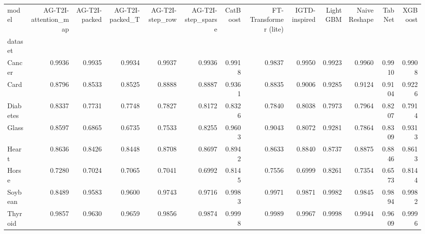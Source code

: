 \begin{tabular}{lrrrrrrrrrrrr}
\toprule
model & AG-T2I-attention_map & AG-T2I-packed & AG-T2I-packed_T & AG-T2I-step_row & AG-T2I-step_sparse & CatBoost & FT-Transformer (lite) & IGTD-inspired & LightGBM & Naive Reshape & TabNet & XGBoost \\
dataset &  &  &  &  &  &  &  &  &  &  &  &  \\
\midrule
Cancer & 0.9936 & 0.9935 & 0.9934 & 0.9937 & 0.9936 & 0.9918 & 0.9837 & 0.9950 & 0.9923 & 0.9960 & 0.9910 & 0.9908 \\
Card & 0.8796 & 0.8533 & 0.8525 & 0.8888 & 0.8887 & 0.9361 & 0.8835 & 0.9006 & 0.9285 & 0.9124 & 0.9104 & 0.9226 \\
Diabetes & 0.8337 & 0.7731 & 0.7748 & 0.7827 & 0.8172 & 0.8326 & 0.7840 & 0.8038 & 0.7973 & 0.7964 & 0.8207 & 0.7914 \\
Glass & 0.8597 & 0.6865 & 0.6735 & 0.7533 & 0.8255 & 0.9603 & 0.9043 & 0.8072 & 0.9281 & 0.7864 & 0.8309 & 0.9313 \\
Heart & 0.8636 & 0.8426 & 0.8448 & 0.8708 & 0.8697 & 0.8942 & 0.8633 & 0.8840 & 0.8737 & 0.8875 & 0.8846 & 0.8613 \\
Horse & 0.7280 & 0.7024 & 0.7065 & 0.7041 & 0.6992 & 0.8145 & 0.7556 & 0.6999 & 0.8261 & 0.7354 & 0.6573 & 0.8144 \\
Soybean & 0.8489 & 0.9583 & 0.9600 & 0.9743 & 0.9716 & 0.9983 & 0.9971 & 0.9871 & 0.9982 & 0.9845 & 0.9894 & 0.9982 \\
Thyroid & 0.9857 & 0.9630 & 0.9659 & 0.9856 & 0.9874 & 0.9998 & 0.9989 & 0.9967 & 0.9998 & 0.9944 & 0.9609 & 0.9996 \\
\bottomrule
\end{tabular}
